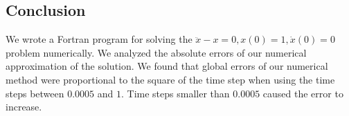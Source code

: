 \subsection{Conclusion}

We wrote a Fortran program for solving the $\ddot{x} - x = 0, x(0)=1, \dot{x}(0)=0$ problem numerically. We analyzed the absolute errors of our numerical approximation of the solution. We found that global errors of our numerical method were proportional to the square of the time step when using the time steps between $0.0005$ and $1$. Time steps smaller than $0.0005$ caused the error to increase.